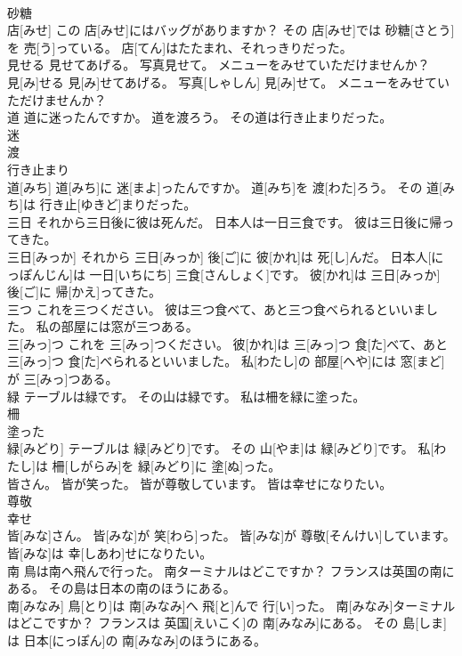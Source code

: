 \documentclass[8pt]{extreport}
\begin{document}
\begin{CJK}{UTF8}{min}
\\	砂糖 
\\	店[みせ] この 店[みせ]にはバッグがありますか？ その 店[みせ]では 砂糖[さとう]を 売[う]っている。 店[てん]はたたまれ、それっきりだった。
\\	見せる 見せてあげる。 写真見せて。 メニューをみせていただけませんか？	
\\	見[み]せる 見[み]せてあげる。 写真[しゃしん] 見[み]せて。 メニューをみせていただけませんか？
\\	道 道に迷ったんですか。 道を渡ろう。 その道は行き止まりだった。	
\\	迷 
\\	渡 
\\	行き止まり 
\\	道[みち] 道[みち]に 迷[まよ]ったんですか。 道[みち]を 渡[わた]ろう。 その 道[みち]は 行き止[ゆきど]まりだった。
\\	三日 それから三日後に彼は死んだ。 日本人は一日三食です。 彼は三日後に帰ってきた。	
\\	三日[みっか] それから 三日[みっか] 後[ご]に 彼[かれ]は 死[し]んだ。 日本人[にっぽんじん]は 一日[いちにち] 三食[さんしょく]です。 彼[かれ]は 三日[みっか] 後[ご]に 帰[かえ]ってきた。
\\	三つ これを三つください。 彼は三つ食べて、あと三つ食べられるといいました。 私の部屋には窓が三つある。	
\\	三[みっ]つ これを 三[みっ]つください。 彼[かれ]は 三[みっ]つ 食[た]べて、あと 三[みっ]つ 食[た]べられるといいました。 私[わたし]の 部屋[へや]には 窓[まど]が 三[みっ]つある。
\\	緑 テーブルは緑です。 その山は緑です。 私は柵を緑に塗った。	
\\	柵 
\\	塗った 
\\	緑[みどり] テーブルは 緑[みどり]です。 その 山[やま]は 緑[みどり]です。 私[わたし]は 柵[しがらみ]を 緑[みどり]に 塗[ぬ]った。
\\	皆さん。 皆が笑った。 皆が尊敬しています。 皆は幸せになりたい。	
\\	尊敬 
\\	幸せ 
\\	皆[みな]さん。 皆[みな]が 笑[わら]った。 皆[みな]が 尊敬[そんけい]しています。 皆[みな]は 幸[しあわ]せになりたい。
\\	南 鳥は南へ飛んで行った。 南ターミナルはどこですか？ フランスは英国の南にある。 その島は日本の南のほうにある。	
\\	南[みなみ] 鳥[とり]は 南[みなみ]へ 飛[と]んで 行[い]った。 南[みなみ]ターミナルはどこですか？ フランスは 英国[えいこく]の 南[みなみ]にある。 その 島[しま]は 日本[にっぽん]の 南[みなみ]のほうにある。

\end{CJK}
\end{document}

